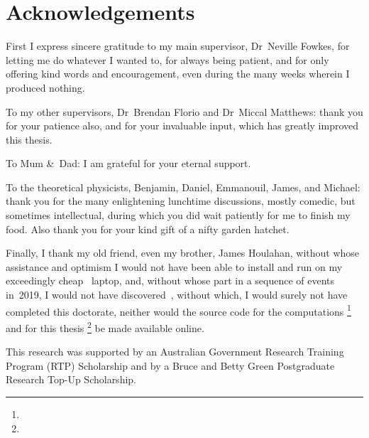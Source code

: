 \chapter{Acknowledgements}
\label{ch:acknowledgements}

\begin{loosecontent}

First I express sincere gratitude to my main supervisor,
Dr~Neville Fowkes,
for letting me do whatever I wanted to,
for always being patient,
and for only offering kind words and encouragement,
even during the many weeks wherein I produced nothing.

To my other supervisors,
Dr~Brendan Florio and Dr~Miccal Matthews:
thank you for your patience also,
and for your invaluable input,
which has greatly improved this thesis.

To Mum \&~Dad:
I am grateful for your eternal support.

To the theoretical physicists,
Benjamin, Daniel, Emmanouil, James, and Michael:
thank you for the many enlightening lunchtime discussions,
mostly comedic, but sometimes intellectual,
during which you did wait patiently for me to finish my food.
Also thank you for your kind gift of a nifty garden hatchet.

Finally, I thank my old friend, even my brother, James Houlahan,
without whose assistance and optimism
I would not have been able to install and run 
on my exceedingly cheap ~laptop,
and, without whose part in a sequence of events in~2019,
I would not have discovered~,
without which, I would surely not have completed this doctorate,
neither would the source code for the computations%
  \footnote{}
and for this thesis%
  \footnote{}
be made available online.

\end{loosecontent}

\thematicbreak

This research was supported
by an Australian Government Research Training Program (RTP) Scholarship
and by a Bruce and Betty Green Postgraduate Research Top-Up Scholarship.
